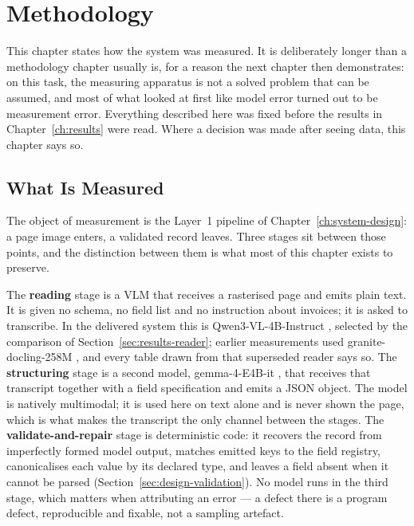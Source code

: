 \chapter{Methodology}
\label{ch:methodology}

This chapter states how the system was measured. It is deliberately longer than a
methodology chapter usually is, for a reason the next chapter then demonstrates: on this
task, the measuring apparatus is not a solved problem that can be assumed, and most of
what looked at first like model error turned out to be measurement error. Everything
described here was fixed before the results in
Chapter~\ref{ch:results} were read. Where a decision was made after seeing data, this
chapter says so.

\section{What Is Measured}
\label{sec:method-architecture}

The object of measurement is the Layer~1 pipeline of Chapter~\ref{ch:system-design}: a page
image enters, a validated record leaves. Three stages sit between those points, and the
distinction between them is what most of this chapter exists to preserve.

The \textbf{reading} stage is a \ac{VLM} that receives a rasterised page and emits plain
text. It is given no schema, no field list and no instruction about invoices; it is asked to
transcribe. In the delivered system this is Qwen3-VL-4B-Instruct \parencite{qwen3vl}, selected by
the comparison of Section~\ref{sec:results-reader}; earlier measurements used granite-docling-258M
\parencite{granitedocling}, and every table drawn from that superseded reader says so. The
\textbf{structuring} stage is a second model, gemma-4-E4B-it \parencite{gemma4e4b}, that receives
that transcript together with a field specification and emits a \ac{JSON} object. The model
is natively multimodal; it is used here on text alone and is never shown the page, which is
what makes the transcript the only channel between the stages. The
\textbf{validate-and-repair} stage is deterministic code: it recovers the record from
imperfectly formed model output, matches emitted keys to the field registry, canonicalises
each value by its declared type, and leaves a field absent when it cannot be parsed
(Section~\ref{sec:design-validation}). No model runs in the third stage, which matters when
attributing an error --- a defect there is a program defect, reproducible and fixable, not a
sampling artefact.

